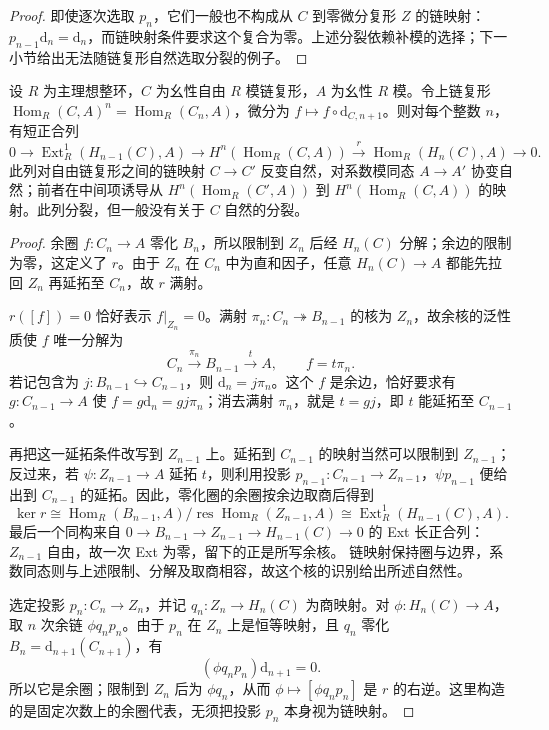 \begin{proof}
	即使逐次选取 \(p_n\)，它们一般也不构成从 \(C\) 到零微分复形 \(Z\) 的链映射：\(p_{n-1}\mathrm{d}_n=\mathrm{d}_n\)，而链映射条件要求这个复合为零。上述分裂依赖补模的选择；下一小节给出无法随链复形自然选取分裂的例子。
\end{proof}

\begin{theorem}[上同调的万有系数定理]\label{b4:thm:uct-cohomology}
	设 \(R\) 为主理想整环，\(C\) 为幺性自由 \(R\) 模链复形，\(A\) 为幺性 \(R\) 模。令上链复形 \(\operatorname{Hom}_R(C,A)^n=\operatorname{Hom}_R(C_n,A)\)，微分为 \(f\mapsto f\circ\mathrm{d}_{C,n+1}\)。则对每个整数 \(n\)，有短正合列
	\[
		0\longrightarrow\operatorname{Ext}_R^1(H_{n-1}(C),A) \longrightarrow H^n(\operatorname{Hom}_R(C,A)) \xrightarrow{r}\operatorname{Hom}_R(H_n(C),A)\longrightarrow0.
	\]
	此列对自由链复形之间的链映射 \(C\to C'\) 反变自然，对系数模同态 \(A\to A'\) 协变自然；前者在中间项诱导从 \(H^n(\operatorname{Hom}_R(C',A))\) 到 \(H^n(\operatorname{Hom}_R(C,A))\) 的映射。此列分裂，但一般没有关于 \(C\) 自然的分裂。
\end{theorem}
\begin{proof}
	余圈 \(f:C_n\to A\) 零化 \(B_n\)，所以限制到 \(Z_n\) 后经 \(H_n(C)\) 分解；余边的限制为零，这定义了 \(r\)。由于 \(Z_n\) 在 \(C_n\) 中为直和因子，任意 \(H_n(C)\to A\) 都能先拉回 \(Z_n\) 再延拓至 \(C_n\)，故 \(r\) 满射。

	\(r([f])=0\) 恰好表示 \(f|_{Z_n}=0\)。满射 \(\pi_n:C_n\twoheadrightarrow B_{n-1}\) 的核为 \(Z_n\)，故余核的泛性质使 \(f\) 唯一分解为
	\[
		C_n\xrightarrow{\pi_n}B_{n-1}\xrightarrow{t}A, \qquad f=t\pi_n.
	\]
	若记包含为 \(j:B_{n-1}\hookrightarrow C_{n-1}\)，则 \(\mathrm{d}_n=j\pi_n\)。这个 \(f\) 是余边，恰好要求有 \(g:C_{n-1}\to A\) 使 \(f=g\mathrm{d}_n=gj\pi_n\)；消去满射 \(\pi_n\)，就是 \(t=gj\)，即 \(t\) 能延拓至 \(C_{n-1}\)。

	再把这一延拓条件改写到 \(Z_{n-1}\) 上。延拓到 \(C_{n-1}\) 的映射当然可以限制到 \(Z_{n-1}\)；反过来，若 \(\psi:Z_{n-1}\to A\) 延拓 \(t\)，则利用投影 \(p_{n-1}:C_{n-1}\to Z_{n-1}\)，\(\psi p_{n-1}\) 便给出到 \(C_{n-1}\) 的延拓。因此，零化圈的余圈按余边取商后得到
	\[
		\ker r\cong\operatorname{Hom}_R(B_{n-1},A)/ \operatorname{res}\operatorname{Hom}_R(Z_{n-1},A) \cong\operatorname{Ext}_R^1(H_{n-1}(C),A).
	\]
	最后一个同构来自 \(0\to B_{n-1}\to Z_{n-1}\to H_{n-1}(C)\to0\) 的 Ext 长正合列：\(Z_{n-1}\) 自由，故一次 Ext 为零，留下的正是所写余核。 链映射保持圈与边界，系数同态则与上述限制、分解及取商相容，故这个核的识别给出所述自然性。

	选定投影 \(p_n:C_n\to Z_n\)，并记 \(q_n:Z_n\to H_n(C)\) 为商映射。对 \(\phi:H_n(C)\to A\)，取 \(n\) 次余链 \(\phi q_np_n\)。由于 \(p_n\) 在 \(Z_n\) 上是恒等映射，且 \(q_n\) 零化 \(B_n=\mathrm{d}_{n+1}(C_{n+1})\)，有
	\[
		(\phi q_np_n)\mathrm{d}_{n+1}=0.
	\]
	所以它是余圈；限制到 \(Z_n\) 后为 \(\phi q_n\)，从而 \(\phi\mapsto[\phi q_np_n]\) 是 \(r\) 的右逆。这里构造的是固定次数上的余圈代表，无须把投影 \(p_n\) 本身视为链映射。
\end{proof}

